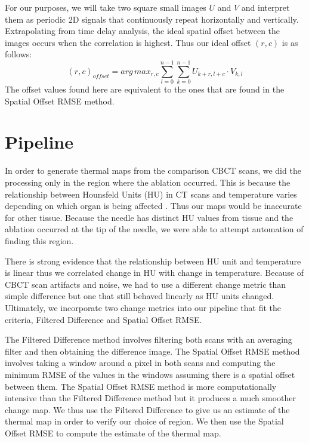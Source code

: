\documentclass[]{spie}  %
\begin{document}
For our purposes, we will take two square small images $U$ and $V$ and interpret them as periodic 2D signals that continuously repeat horizontally and vertically. Extrapolating from time delay analysis, the ideal spatial offset between the images occurs when the correlation is highest. Thus our ideal offset $(r,c)$ is as follows:
\[
(r,c)_{offset} = arg\,max_{r,c} \sum_{l=0}^{n-1} \sum_{k=0}^{n-1} {U_{k+r,l+c} \cdot V_{k,l}}
\]
The offset values found here are equivalent to the ones that are found in the Spatial Offset RMSE method. 

\section{Pipeline}

In order to generate thermal maps from the comparison CBCT scans, we did the processing only in the region where the ablation occurred. This is because the relationship between Hounsfeld Units (HU) in CT scans and temperature varies depending on which organ is being affected \cite{Fani14}. Thus our maps would be inaccurate for other tissue. Because the needle has distinct HU values from tissue and the ablation occurred at the tip of the needle, we were able to attempt automation of finding this region.

There is strong evidence that the relationship between HU unit and temperature is linear \cite{Fani14} thus we correlated change in HU with change in temperature. Because of CBCT scan artifacts and noise, we had to use a different change metric than simple difference but one that still behaved linearly as HU units changed. Ultimately, we incorporate two change metrics into our pipeline that fit the criteria, Filtered Difference and Spatial Offset RMSE.  

The Filtered Difference method involves filtering both scans with an averaging filter and then obtaining the difference image. The Spatial Offset RMSE method involves taking a window around a pixel in both scans and computing the minimum RMSE of the values in the windows assuming there is a spatial offset between them. The Spatial Offset RMSE method is more computationally intensive than the Filtered Difference method but it produces a much smoother change map. We thus use the Filtered Difference to give us an estimate of the thermal map in order to verify our choice of region. We then use the Spatial Offset RMSE to compute the estimate of the thermal map. 
\end{document}
